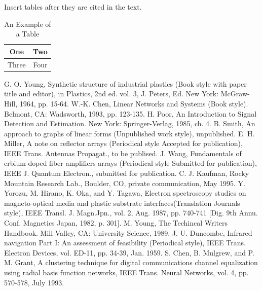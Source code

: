 Insert tables after they are cited in the text.


\begin{table}[h]
\caption{An Example of a Table} \label{table_example}
\begin{center}
\begin{tabular}{|c||c|}
\hline
One & Two\\
\hline
Three & Four\\
\hline
\end{tabular}
\end{center}
\end{table}


 G. O. Young, Synthetic structure of industrial plastics (Book style with paper title and editor), 	in Plastics, 2nd ed. vol. 3, J. Peters, Ed.  New York: McGraw-Hill, 1964, pp. 15-64.
 W.-K. Chen, Linear Networks and Systems (Book style).	Belmont, CA: Wadsworth, 1993, pp. 123-135.
 H. Poor, An Introduction to Signal Detection and Estimation.   New York: Springer-Verlag, 1985, ch. 4.
 B. Smith, An approach to graphs of linear forms (Unpublished work style), unpublished.
 E. H. Miller, A note on reflector arrays (Periodical style Accepted for publication), IEEE Trans. Antennas Propagat., to be publised.
 J. Wang, Fundamentals of erbium-doped fiber amplifiers arrays (Periodical style Submitted for publication), IEEE J. Quantum Electron., submitted for publication.
 C. J. Kaufman, Rocky Mountain Research Lab., Boulder, CO, private communication, May 1995.
 Y. Yorozu, M. Hirano, K. Oka, and Y. Tagawa, Electron spectroscopy studies on magneto-optical media and plastic substrate interfaces(Translation Journals style), IEEE Transl. J. Magn.Jpn., vol. 2, Aug. 1987, pp. 740-741 [Dig. 9th Annu. Conf. Magnetics Japan, 1982, p. 301].
 M. Young, The Techincal Writers Handbook.  Mill Valley, CA: University Science, 1989.
 J. U. Duncombe, Infrared navigation Part I: An assessment of feasibility (Periodical style), IEEE Trans. Electron Devices, vol. ED-11, pp. 34-39, Jan. 1959.
 S. Chen, B. Mulgrew, and P. M. Grant, A clustering technique for digital communications channel equalization using radial basis function networks, IEEE Trans. Neural Networks, vol. 4, pp. 570-578, July 1993.
